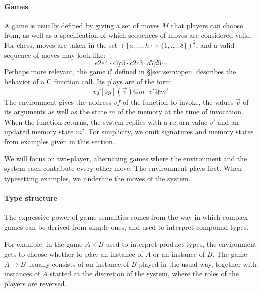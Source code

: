 \documentclass[sigplan,10pt,review,anonymous]{acmart}
\newcommand{\kw}[1]{\ensuremath{ \mathsf{#1} }}
\begin{document}

\paragraph{Games} \label{sec:mainideas:gs:games} %

A game is usually defined by giving a set of moves $M$
that players can choose from,
as well as a specification of which
sequences of moves are considered valid.
For chess,
moves are taken in the set $(\{a, \ldots, h\} \times \{1, \ldots, 8\})^2$,
and a valid sequence of moves may look like:
\[ e2e4 \cdot \underline{c7c5} \cdot c2c3 \cdot \underline{d7d5} \cdots \]
Perhaps more relevant,
the game $\mathcal{C}$ defined in \S\ref{sec:sem:open}
describes the behavior of a C function call.
Its plays are of the form:
\[ \mathit{vf}[\mathit{sg}](\vec{v})@m \cdot \underline{v'@m'} \]
The environment gives the address $\mathit{vf}$
of the function to invoke,
the values $\vec{v}$ of its arguments
as well as the state $m$ of the memory
at the time of invocation.
When the function returns,
the system replies with
a return value $v'$
and an updated memory state $m'$.
For simplicity,
we omit signatures and memory states
from examples given in this section.

We will focus on two-player, alternating games
where the environment and the system each contribute every other move.
The environment plays first.
When typesetting examples,
we underline the moves of the system.



\paragraph{Type structure} \label{sec:mainideas:gs:types} %

The expressive power of game semantics
comes from the way in which complex games can be derived from simple ones,
and used to interpret compound types.

For example,
in the game $A \times B$ used to interpret product types,
the environment gets to choose whether to play
an instance of $A$ or an instance of $B$.
The game $A \rightarrow B$ usually consists of
an instance of $B$ played in the usual way,
together with instances of $A$
started at the discretion of the system,
where the roles of the players are reversed.
\end{document}
